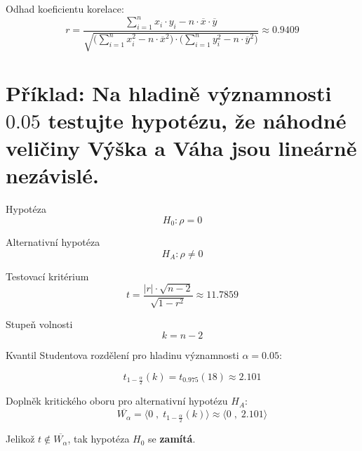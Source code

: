 \begin{compactitem}
    \item Odhad koeficientu korelace:
    $${\displaystyle r = \frac{\sum\limits_{i=1}^n x_i \cdot y_i - n \cdot \overline{x} \cdot \overline{y}} {\sqrt{ \bigg( \sum\limits_{i=1}^n x_i^2 - n \cdot \overline{x}^2\bigg) \cdot \bigg( \sum\limits_{i=1}^n y_i^2 - n \cdot \overline{y}^2 \bigg)}} \approx 0.9409}$$
\end{compactitem}


\section{Příklad: Na hladině významnosti $0.05$ testujte hypotézu, že náhodné veličiny Výška a Váha jsou lineárně nezávislé.}

\begin{compactitem}
    \item Hypotéza
    $${\displaystyle H_0 : \rho = 0}$$

    \item Alternativní hypotéza
    $${\displaystyle H_A : \rho \neq 0}$$

    \item Testovací kritérium
    $${\displaystyle t = \frac{|r| \cdot \sqrt{n - 2}}{\sqrt{1 - r^2}} \approx 11.7859}$$

    \item Stupeň volnosti
    $${\displaystyle k = n - 2}$$

    \item Kvantil Studentova rozdělení pro hladinu významnosti
    ${\displaystyle \alpha = 0.05}$:

    $${\displaystyle \qquad t_{1 - \frac{\alpha}{2}}(k) = t_{0.975}(18) \approx 2.101}$$

    \item Doplněk kritického oboru pro alternativní hypotézu ${\displaystyle H_{A}}$:
    $${\displaystyle \qquad \overline{W_\alpha} = \big\langle 0 \;,\; t_{1 - \frac{\alpha}{2}}(k) \big\rangle \approx \big\langle 0 \;,\; 2.101 \big\rangle}$$

    \item Jelikož ${\displaystyle t \notin \overline{W_\alpha}}$, tak hypotéza ${\displaystyle H_0}$ se \textbf{zamítá}.
\end{compactitem}


